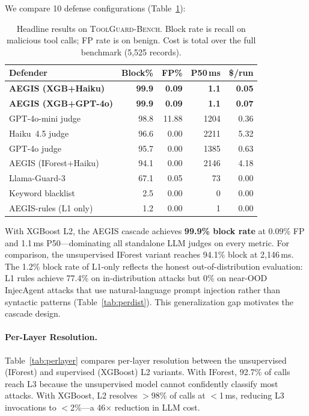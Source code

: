 \documentclass[sigconf,anonymous]{acmart}
\newcommand{\bench}{\textsc{ToolGuard-Bench}\xspace}
\begin{document}
We compare 10 defense configurations (Table~\ref{tab:overall}):

\begin{table}[t]
\centering\small
\caption{Headline results on \bench. Block rate is recall on malicious tool calls; FP rate is on benign. Cost is total over the full benchmark (5{,}525 records).}
\vspace{-0.1in}
\label{tab:overall}
\begin{tabular}{lrrrr}
\toprule
Defender & Block\% & FP\% & P50\,ms & \$/run \\
\midrule
\rowcolor{green!8}
\textbf{AEGIS (XGB+Haiku)} & \textbf{99.9} & \textbf{0.09} & \textbf{1.1} & \textbf{0.05} \\
\rowcolor{green!8}
\textbf{AEGIS (XGB+GPT-4o)} & \textbf{99.9} & \textbf{0.09} & \textbf{1.1} & \textbf{0.07} \\
GPT-4o-mini judge & 98.8 & 11.88 & 1204 & 0.36 \\
Haiku~4.5 judge & 96.6 & 0.00 & 2211 & 5.32 \\
GPT-4o judge & 95.7 & 0.00 & 1385 & 0.63 \\
AEGIS (IForest+Haiku) & 94.1 & 0.00 & 2146 & 4.18 \\
Llama-Guard-3 & 67.1 & 0.05 & 73 & 0.00 \\
Keyword blacklist & 2.5 & 0.00 & 0 & 0.00 \\
AEGIS-rules (L1 only) & 1.2 & 0.00 & 1 & 0.00 \\
\bottomrule
\end{tabular}
\vspace{-0.1in}
\end{table}

With XGBoost L2, the AEGIS cascade achieves \textbf{99.9\% block rate} at 0.09\% FP and 1.1\,ms P50---dominating all standalone LLM judges on every metric. For comparison, the unsupervised IForest variant reaches 94.1\% block at 2{,}146\,ms. The 1.2\% block rate of L1-only reflects the honest out-of-distribution evaluation: L1 rules achieve 77.4\% on in-distribution attacks but 0\% on near-OOD InjecAgent attacks that use natural-language prompt injection rather than syntactic patterns (Table~\ref{tab:perdist}). This generalization gap motivates the cascade design.

\paragraph{Per-Layer Resolution.}
Table~\ref{tab:perlayer} compares per-layer resolution between the unsupervised (IForest) and supervised (XGBoost) L2 variants. With IForest, 92.7\% of calls reach L3 because the unsupervised model cannot confidently classify most attacks. With XGBoost, L2 resolves $>$98\% of calls at $<$1\,ms, reducing L3 invocations to $<$2\%---a 46$\times$ reduction in LLM cost.
\end{document}
